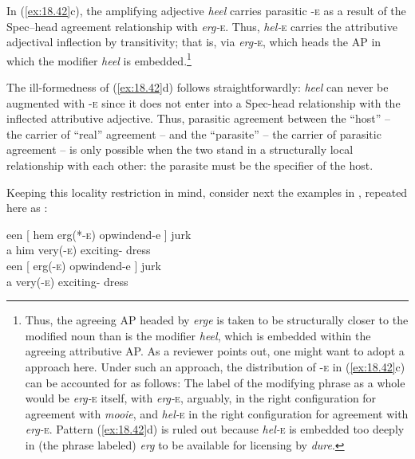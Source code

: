 \documentclass[output=paper]{langsci/langscibook}
\begin{document}
In (\ref{ex:18.42}c), the amplifying adjective \emph{heel} carries parasitic
\textsc{-e} as a result of the Spec--head agreement relationship with
\emph{erg-}\textsc{e}. Thus, \emph{hel-}\textsc{e} carries the attributive
adjectival inflection by transitivity; that is, via \emph{erg-}\textsc{e},
which heads the AP in which the modifier \emph{heel} is
embedded.\footnote{Thus, the agreeing AP headed by \emph{erge} is taken to be
structurally closer to the modified noun than is the modifier \emph{heel},
which is embedded within the agreeing attributive AP. As a reviewer points out,
one might want to adopt a  approach here. Under such an
approach, the distribution of \textsc{-e} in (\ref{ex:18.42}c) can be accounted
for as follows: The label of the modifying phrase as a whole would be
\emph{erg-}\textsc{e} itself, with \emph{erg-}\textsc{e}, arguably, in the
right configuration for agreement with \emph{mooie}, and \emph{hel-}\textsc{e}
in the right configuration for agreement with \emph{erg-}\textsc{e}. Pattern
(\ref{ex:18.42}d) is ruled out because \emph{hel-}\textsc{e} is embedded too
deeply in (the phrase labeled) \emph{erg} to be available for licensing by
\emph{dure}.}

The ill-formedness of (\ref{ex:18.42}d) follows straightforwardly: \emph{heel}
can never be augmented with \textsc{-e} since it does not enter into a
Spec-head relationship with the inflected attributive adjective. Thus,
parasitic agreement between the \enquote{host} -- the carrier of \enquote{real}
agreement – and the \enquote{parasite} – the carrier of parasitic agreement –
is only possible when the two stand in a structurally local relationship with
each other: the parasite must be the specifier of the host.

Keeping this locality restriction in mind, consider next the examples in
, repeated here as :

\ea%
    \label{ex:18.46}
	\ea
	\gll een [ hem  erg(*-\textsc{e})  opwindend-e ]    jurk\\
    a   {}     him  very(-\textsc{e})    exciting-\Agr{} {} dress\\
	\ex
	\gll een [ erg(-\textsc{e})    opwindend-e ]    jurk \\
    a   {}   very(-\textsc{e})    exciting-\Agr{} {} dress\\
	\z
\z
\end{document}
